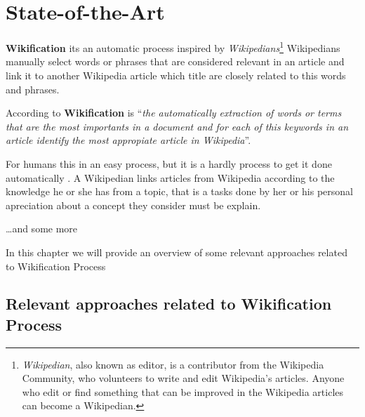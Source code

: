 
\chapter{State-of-the-Art}

\ifpdf
    \graphicspath{{Chapter2/Figs/Raster/}{Chapter2/Figs/PDF/}{Chapter2/Figs/}}
\else
    \graphicspath{{Chapter2/Figs/Vector/}{Chapter2/Figs/}}
\fi

\textbf{Wikification} its an automatic process inspired by \textit{Wikipedians}\footnote{\textit{Wikipedian}, also known as editor, is a contributor from the Wikipedia Community, who volunteers to write and edit Wikipedia's articles. 
Anyone who edit or find something that can be improved in the Wikipedia articles can become a Wikipedian.}
Wikipedians manually select words or phrases that are considered relevant in an article and link it to another Wikipedia article which title are closely related to this words and phrases.

According to \citep{Mihalcea2007} \textbf{Wikification} is ``\textit{the automatically extraction of words or terms that are the most importants in a document and for each of this keywords in an article identify the most appropiate article in
Wikipedia}''.

For humans this in an easy process, but it is a hardly process to get it done automatically \citep{Roris2014}.
A Wikipedian links articles from Wikipedia according to the knowledge he or she has from a topic, that is a tasks done by her or his personal apreciation about a concept they consider must be explain.

\dots and some more

In this chapter we will provide an overview of some relevant approaches related to Wikification Process

\section[Relevant approaches related to Wikification Process]{Relevant approaches related to Wikification Process}



